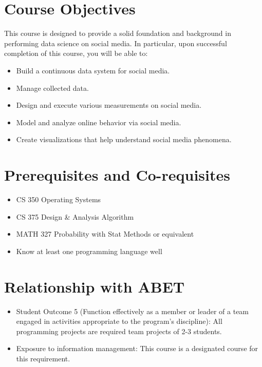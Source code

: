 \documentclass[11pt,article,oneside]{memoir} %
\begin{document}
\section{Course Objectives}%

This course is designed to provide a solid foundation and background in performing data science on social media.
In particular, upon successful completion of this course, you will be able to:

\begin{itemize}
    \item Build a continuous data system for social media.
    \item Manage collected data.
    \item Design and execute various measurements on social media.
    \item Model and analyze online behavior via social media.
    \item Create visualizations that help understand social media phenomena.
\end{itemize}



\section{Prerequisites and Co-requisites}%
\label{sec:Prerequisites}

\begin{itemize}
    \item CS 350 Operating Systems
    \item CS 375 Design \& Analysis Algorithm
    \item MATH 327 Probability with Stat Methods or equivalent
    \item Know at least one programming language well
\end{itemize}


\section{Relationship with ABET}%

\begin{itemize}
    \item Student Outcome 5 (Function effectively as a member or leader of a team engaged in
    activities appropriate to the program's discipline): All programming projects are required
    team projects of 2-3 students.
    \item Exposure to information management: This course is a designated course for this
    requirement.
\end{itemize}
\end{document}
